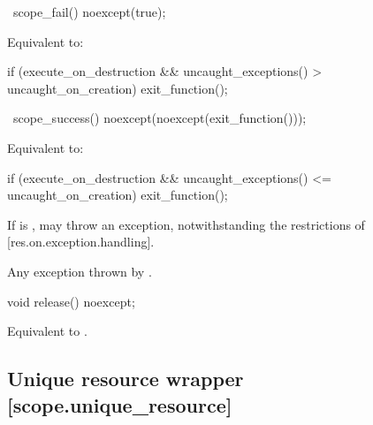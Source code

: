 \documentclass[ebook,11pt,article]{memoir}
\begin{document}
\begin{itemdecl}
~scope_fail() noexcept(true);
\end{itemdecl}

\begin{itemdescr}
\pnum
\effects 
Equivalent to:
\begin{codeblock}
if (execute_on_destruction
   && uncaught_exceptions() > uncaught_on_creation)
	exit_function();
\end{codeblock}
\end{itemdescr}

\begin{itemdecl}
~scope_success() noexcept(noexcept(exit_function()));
\end{itemdecl}

\begin{itemdescr}
\pnum
\effects
Equivalent to:
\begin{codeblock}
if (execute_on_destruction 
   && uncaught_exceptions() <= uncaught_on_creation)
	exit_function();   
\end{codeblock}

\pnum
\begin{note}
If  is ,  may throw an exception, notwithstanding the restrictions of [res.on.exception.handling].
\end{note}

\pnum
\throws
Any exception thrown by .

\end{itemdescr}

\begin{itemdecl}
void release() noexcept;
\end{itemdecl}

\begin{itemdescr}
\pnum
\effects
Equivalent to
.
\end{itemdescr}


\newpage

\subsection{Unique resource wrapper [scope.unique_resource]}
\end{document}
